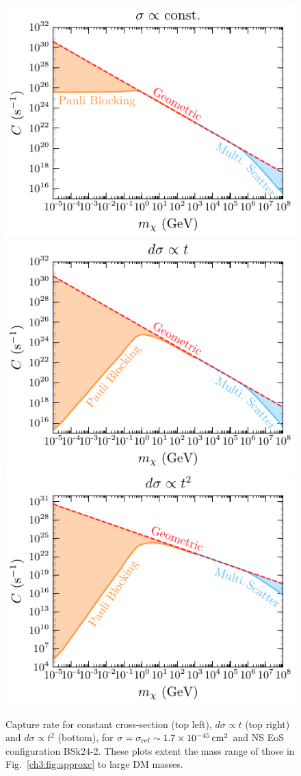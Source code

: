 \begin{figure}[t!bp]
    \centering
    \includegraphics[width=.48\textwidth]{capture_1/capture_rate_n0_fullmassrange.pdf}    
    \includegraphics[width=.48\textwidth]{capture_1/capture_rate_n1_fullmassrange.pdf}       
    \includegraphics[width=.48\textwidth]{capture_1/capture_rate_n2_fullmassrange.pdf}       
    \caption{Capture rate for constant cross-section (top left), $d\sigma\propto t$ (top right) and $d\sigma\propto t^2$ (bottom),  for  $\sigma=\sigma_\mathrm{ref}\sim 1.7 \times 10^{-45}{\rm \,cm}^2$ and NS EoS configuration BSk24-2. These plots extent the mass range of those in Fig.~\ref{ch3:fig:approxc} to large DM masses.
    }
    \label{ch3:fig:capturelargemass}
\end{figure}

